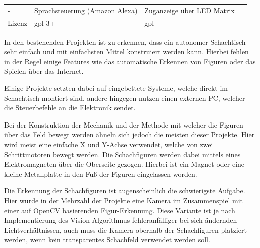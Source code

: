 \begin{longtable}[]{@{}llll@{}}
\begin{minipage}[t]{0.24\columnwidth}
-\strut
\end{minipage} & \begin{minipage}[t]{0.26\columnwidth}\raggedright
Sprachsteuerung (Amazon Alexa)\strut
\end{minipage} & \begin{minipage}[t]{0.19\columnwidth}\raggedright
Zuganzeige über LED Matrix\strut
\end{minipage}\tabularnewline
\begin{minipage}[t]{0.20\columnwidth}\raggedright
Lizenz\strut
\end{minipage} & \begin{minipage}[t]{0.24\columnwidth}\raggedright
\gls{gpl} 3+\strut
\end{minipage} & \begin{minipage}[t]{0.26\columnwidth}\raggedright
\gls{gpl}\strut
\end{minipage} & \begin{minipage}[t]{0.19\columnwidth}\raggedright
-\strut
\end{minipage}\tabularnewline
\bottomrule
\end{longtable}

In den bestehenden Projekten ist zu erkennen, dass ein autonomer
Schachtisch sehr einfach und mit einfachsten Mittel konstruiert werden
kann. Hierbei fehlen in der Regel einige Features wie das automatische
Erkennen von Figuren oder das Spielen über das Internet.

Einige Projekte setzten dabei auf eingebettete Systeme, welche direkt im
Schachtisch montiert sind, andere hingegen nutzen einen externen PC,
welcher die Steuerbefehle an die Elektronik sendet.

Bei der Konstruktion der Mechanik und der Methode mit welcher die
Figuren über das Feld bewegt werden ähneln sich jedoch die meisten
dieser Projekte. Hier wird meist eine einfache X und Y-Achse verwendet,
welche von zwei Schrittmotoren bewegt werden. Die Schachfiguren werden
dabei mittels eines Elektromagneten über die Oberseite gezogen. Hierbei
ist ein Magnet oder eine kleine Metallplatte in den Fuß der Figuren
eingelassen worden.

Die Erkennung der Schachfiguren ist augenscheinlich die schwierigste
Aufgabe. Hier wurde in der Mehrzahl der Projekte eine Kamera im
Zusammenspiel mit einer auf OpenCV basierenden Figur-Erkennung. Diese
Variante ist je nach Implementierung des Vision-Algorithmus
fehleranfälliger bei sich ändernden Lichtverhältnissen, auch muss die
Kamera oberhalb der Schachfiguren platziert werden, wenn kein
transparentes Schachfeld verwendet werden soll.

